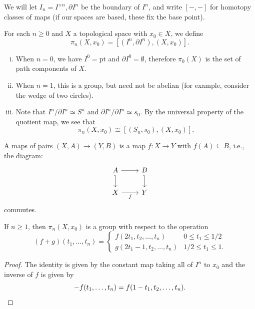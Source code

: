 \documentclass[ma3408.tex]{subfiles}
\begin{document}
\begin{Not} We will let $I_n = I^{\times n}, \partial I^n$ be the boundary of $I^n$, and write $[-,-]$ for homotopy classes of maps (if our spaces are based, these fix the base point).
\end{Not}
\begin{Def}
	For each $n \ge 0$ and $X$ a topological space with $x_0 \in X$, we define
	\[
\pi_n(X, x_0) = [(I^n, \partial I^n), (X, x_0)].
\]
\end{Def}
\begin{Rem}
	\begin{enumerate}[(i)]
		\item When $n = 0$, we have $I^0 = \text{pt}$ and $\partial I^0 = \emptyset$, therefore $\pi_0(X)$ is the set of path components of $X$.
		\item When $n = 1$, this is a group, but need not be abelian (for example, consider the wedge of two circles).
		\item Note that $I^n / \partial I^n \simeq S^n$ and $\partial I^n / \partial I^n \simeq s_0$. By the universal property of the quotient map, we see that 
		\[
		\pi_n(X, x_0) \cong [(S_n, s_0), (X, x_0)].
\]
	\end{enumerate}
\end{Rem}
\begin{Def}
	A maps of pairs $(X,A) \to (Y,B)$ is a map $f \colon X \to Y$ with $f(A) \subseteq B$, i.e., the diagram:
\[\begin{tikzcd}
	A & B \\
	X & Y
	\arrow[from=1-1, to=1-2]
	\arrow["f"', from=2-1, to=2-2]
	\arrow[hook', from=1-1, to=2-1]
	\arrow[hook', from=1-2, to=2-2]
\end{tikzcd}\]
	commutes. 
\end{Def}
\begin{Prop}
	If $n \ge 1$, then $\pi_n(X,x_0)$ is a group with respect to the operation
	\[
(f+g)(t_1,\ldots,t_n) = \begin{cases}
	f(2t_1,t_2,\ldots,t_n) & 0 \le t_1 \le 1/2 \\
	g(2t_1-1,t_2,\ldots,t_n) & 1/2 \le t_1 \le 1. 
\end{cases}
	\]
\end{Prop}
\begin{proof}
	The identity is given by the constant map taking all of $I^n$ to $x_0$ and the inverse of $f$ is given by 
	\[
-f(t_1,\ldots,t_n) = f(1-t_1,t_2,\ldots,t_n). \qedhere
	\]
\end{proof}
\end{document}
